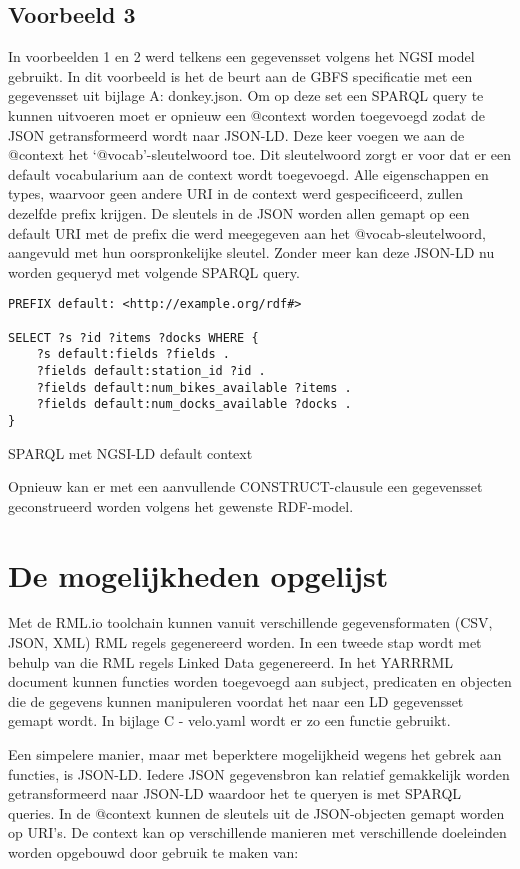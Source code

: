 \subsection{Voorbeeld 3}
\label{subsec:vb3}
In voorbeelden 1 en 2 werd telkens een gegevensset volgens het NGSI model gebruikt. In dit voorbeeld is het de beurt aan de GBFS specificatie met een gegevensset uit bijlage A: donkey.json. Om op deze set een SPARQL query te kunnen uitvoeren moet er opnieuw een @context worden toegevoegd zodat de JSON getransformeerd wordt naar JSON-LD. 
Deze keer voegen we aan de @context het `@vocab'-sleutelwoord toe. Dit sleutelwoord zorgt er voor dat er een default vocabularium aan de context wordt toegevoegd. Alle eigenschappen en types, waarvoor geen andere URI in de context werd gespecificeerd, zullen dezelfde prefix krijgen.
De sleutels in de JSON worden allen gemapt op een default URI met de prefix die werd meegegeven aan het @vocab-sleutelwoord, aangevuld met hun oorspronkelijke sleutel. Zonder meer kan deze JSON-LD nu worden gequeryd met volgende SPARQL query.

\begin{code}
\centering
\begin{verbatim}
PREFIX default: <http://example.org/rdf#>

SELECT ?s ?id ?items ?docks WHERE {
    ?s default:fields ?fields .
    ?fields default:station_id ?id .
    ?fields default:num_bikes_available ?items .
    ?fields default:num_docks_available ?docks .
}
\end{verbatim}
\caption{SPARQL met NGSI-LD default context}
\label{ngsild-default-context}
\end{code}

Opnieuw kan er met een aanvullende CONSTRUCT-clausule een gegevensset geconstrueerd worden volgens het gewenste RDF-model.

\section{De mogelijkheden opgelijst}
Met de RML.io toolchain kunnen vanuit verschillende gegevensformaten (CSV, JSON, XML) RML regels gegenereerd worden. In een tweede stap wordt met behulp van die RML regels Linked Data gegenereerd. In het YARRRML document kunnen functies worden toegevoegd aan subject, predicaten en objecten die de gegevens kunnen manipuleren voordat het naar een LD gegevensset gemapt wordt. In bijlage C - velo.yaml wordt er zo een functie gebruikt.

Een simpelere manier, maar met beperktere mogelijkheid wegens het gebrek aan functies, is JSON-LD. Iedere JSON gegevensbron kan relatief gemakkelijk worden getransformeerd naar JSON-LD waardoor het te queryen is met SPARQL queries. In de @context kunnen de sleutels uit de JSON-objecten gemapt worden op URI's. De context kan op verschillende manieren met verschillende doeleinden worden opgebouwd door gebruik te maken van:

